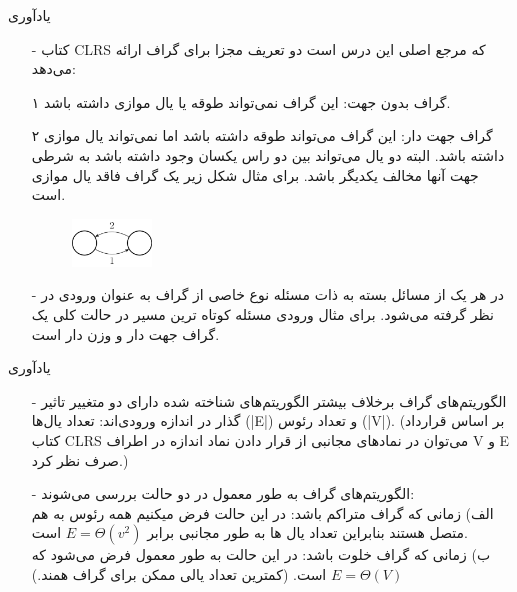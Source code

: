 \begin{frame}{يادآوری}
	\begin{itemize}\itemr
		\item[-]
کتاب CLRS که مرجع اصلی این درس است دو تعریف مجزا برای گراف ارائه می‌دهد:
\item[۱]
گراف بدون جهت: این گراف نمی‌تواند طوقه یا یال موازی داشته باشد.
\item[۲]
گراف جهت دار: این گراف می‌تواند طوقه داشته باشد اما نمی‌تواند یال موازی داشته باشد. البته دو یال می‌تواند بین دو راس یکسان وجود داشته باشد به شرطی جهت آنها مخالف یکدیگر باشد. برای مثال شکل زیر یک گراف فاقد یال موازی است.

\begin{figure}[h!]
\centering
\includegraphics[width=0.2\textwidth]{figs/chap02/1.png}
\end{figure}
\item[-]
در هر یک از مسائل بسته به ذات مسئله نوع خاصی از گراف به عنوان ورودی در نظر گرفته می‌شود. برای مثال ورودی مسئله کوتاه ترین مسیر در حالت کلی یک گراف جهت دار و وزن دار است.
\end{itemize}
\end{frame}


\begin{frame}{يادآوری}
	\begin{itemize}\itemr
		\item[-]
الگوریتم‌های گراف برخلاف بیشتر الگوریتم‌های شناخته شده دارای دو متغییر تاثیر گذار در اندازه ورودی‌اند: تعداد یال‌ها (|E|) و تعداد رئوس (|V|). (بر اساس قرارداد کتاب CLRS می‌توان در نمادهای مجانبی از قرار دادن نماد اندازه در اطراف V و E صرف نظر ‌کرد.)

		\item[-]
الگوریتم‌های گراف به طور معمول در دو حالت بررسی می‌شوند:\\

الف) زمانی که گراف متراکم باشد: در این حالت فرض میکنیم همه رئوس به هم متصل هستند بنابراین تعداد یال ها به طور مجانبی برابر $E= \Theta(v^2)$ است.\\

ب) زمانی که گراف خلوت باشد:‌ در این حالت به طور معمول فرض می‌شود که $E= \Theta(V)$ است. (کمترین تعداد یالی ممکن برای گراف همند.)

	\end{itemize}
\end{frame}

